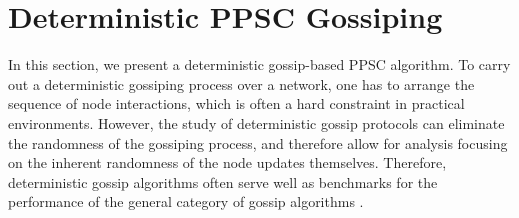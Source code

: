 \documentclass[a4paper, 11pt]{article}
\newcommand{\1}{\mathbf{1}}
\begin{document}













\section{Deterministic PPSC Gossiping}\label{sec:deter}
In this section, we present a deterministic  gossip-based PPSC algorithm. To carry out a deterministic gossiping  process over a network, one has to arrange the sequence of node interactions, which is often a hard constraint in practical environments.  However, the study of deterministic gossip protocols can eliminate  the randomness of the gossiping process, and therefore allow for analysis  focusing  on the inherent randomness of the node updates themselves. Therefore, deterministic gossip algorithms often serve well as benchmarks for the performance of the general category of gossip algorithms \cite{shi-tit-2015}.
\end{document}
